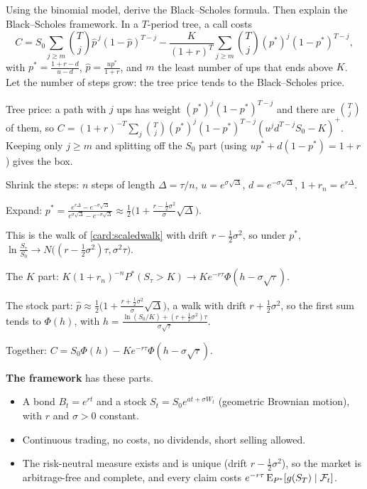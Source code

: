 \begin{problem}[Q3(a)]
Using the binomial model, derive the Black--Scholes formula. Then explain the Black--Scholes framework.
\cardsays In a $T$-period tree, a call costs
\[
C=S_0\sum_{j\ge m}\binom Tj\hat p^{\,j}(1-\hat p)^{T-j}-\frac{K}{(1+r)^T}\sum_{j\ge m}\binom Tj(p^*)^j(1-p^*)^{T-j},
\]
with $p^*=\frac{1+r-d}{u-d}$, $\hat p=\frac{up^*}{1+r}$, and $m$ the least number of ups that ends above $K$.
\cardsays Let the number of steps grow: the tree price tends to the Black--Scholes price.
\working
\begin{steps}
\item Tree price: a path with $j$ ups has weight $(p^*)^j(1-p^*)^{T-j}$ and there are $\binom Tj$ of them, so $C=(1+r)^{-T}\sum_j\binom Tj(p^*)^j(1-p^*)^{T-j}(u^jd^{T-j}S_0-K)^+$. Keeping only $j\ge m$ and splitting off the $S_0$ part (using $up^*+d(1-p^*)=1+r$) gives the box.
\item Shrink the steps: $n$ steps of length $\Delta=\tau/n$, $u=e^{\sigma\sqrt\Delta}$, $d=e^{-\sigma\sqrt\Delta}$, $1+r_n=e^{r\Delta}$.
\item Expand: $p^*=\frac{e^{r\Delta}-e^{-\sigma\sqrt\Delta}}{e^{\sigma\sqrt\Delta}-e^{-\sigma\sqrt\Delta}}\approx\frac12\Big(1+\frac{r-\frac12\sigma^2}{\sigma}\sqrt\Delta\Big)$.
\item This is the walk of \cref{card:scaledwalk} with drift $r-\frac12\sigma^2$, so under $p^*$, $\ln\frac{S_\tau}{S_0}\to N\big((r-\frac12\sigma^2)\tau,\sigma^2\tau\big)$.
\item The $K$ part: $K(1+r_n)^{-n}P^*(S_\tau>K)\to Ke^{-r\tau}\Phi(h-\sigma\sqrt\tau)$.
\item The stock part: $\hat p\approx\frac12\big(1+\frac{r+\frac12\sigma^2}{\sigma}\sqrt\Delta\big)$, a walk with drift $r+\frac12\sigma^2$, so the first sum tends to $\Phi(h)$, with $h=\frac{\ln(S_0/K)+(r+\frac12\sigma^2)\tau}{\sigma\sqrt\tau}$.
\item Together: $C=S_0\Phi(h)-Ke^{-r\tau}\Phi(h-\sigma\sqrt\tau)$.
\end{steps}
\textbf{The framework} has these parts.
\begin{itemize}
\item A bond $B_t=e^{rt}$ and a stock $S_t=S_0e^{at+\sigma W_t}$ (geometric Brownian motion), with $r$ and $\sigma>0$ constant.
\item Continuous trading, no costs, no dividends, short selling allowed.
\item The risk-neutral measure exists and is unique (drift $r-\frac12\sigma^2$), so the market is arbitrage-free and complete, and every claim costs $e^{-r\tau}\operatorname{E}_{P^*}[g(S_T)\mid\mathcal F_t]$.
\end{itemize}
\end{problem}

